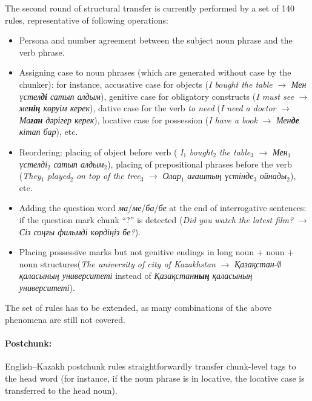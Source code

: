 \documentclass[11pt]{article}
\begin{document}
The second round of structural transfer is currently performed by a %
set of 140 rules, representative of following operations:
\begin{itemize}
\item Persona and number agreement between the subject noun phrase and the verb phrase.
\item Assigning case to noun phrases (which are generated without case by the chunker): for instance, 
  accusative case for objects (\emph{I bought the table} $\rightarrow$ \emph{Мен үстел\textbf{ді}  сатып алдым}), genitive case for 
  obligatory constructs (\emph{I must see} $\rightarrow$ \emph{ме\textbf{нің} көруім керек}),  dative case for the verb \emph{to 
  need} (\emph{I need a doctor} $\rightarrow$ \emph{Ма\textbf{ған} дәрігер керек}), locative case for 
  possession (\emph{I have a book} $\rightarrow$ \emph{Мен\textbf{де} кітап бар}), etc.\ 
 \item Reordering: placing of object before verb ( \emph{I}$_1$ \emph{bought}$_2$ \emph{the table}$_3$ $\rightarrow$ \emph{Мен}$_1$ \emph{үстелді}$_2$ \emph{сатып алдым}$_2$), 
  placing of prepositional phrases before the verb  (\emph{They}$_1$ \emph{played}$_2$ \emph{on top of the tree}$_3$ $\rightarrow$ \emph{Олар}$_1$ \emph{ағаштың үстінде}$_3$ \emph{ойнады}$_2$), etc.\ 
\item Adding the question word \emph{ма}/\emph{ме}/\emph{ба}/\emph{бе} at the end of interrogative sentences: if the question mark chunk ``?'' is detected (\emph{Did} \emph{you} \emph{watch} \emph{the latest film?} $\rightarrow$ \emph{Сіз соңғы фильмді көрдіңіз бе?}).
\item Placing possessive marks but not genitive endings in long noun + noun + noun structures(\emph{The university of city of Kazakhstan} \(\to\) \emph{Қазақстан}-\(\emptyset\) \emph{қаласының университеті} instead of \emph{Қазақстан\textbf{ның} қаласының университеті}).
\end{itemize}

The set of rules has to be extended, as many combinations of the above phenomena are still not covered.

\paragraph{Postchunk:} English--Kazakh postchunk rules straightforwardly transfer chunk-level tags to the head word (for instance, if the noun phrase is in locative, the locative case is transferred to the head noun). 
\end{document}
